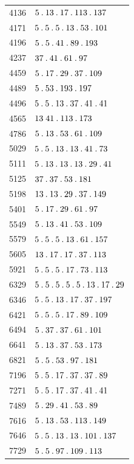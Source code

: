 \begin{longtable}{@{}r|l@{}}
4136 & $5\pdot 13\pdot 17\pdot 113\pdot 137$\\
4171 & $5\pdot 5\pdot 5\pdot 13\pdot 53\pdot 101$\\
4196 & $5\pdot 5\pdot 41\pdot 89\pdot 193$\\
4237 & $37\pdot 41\pdot 61\pdot 97$\\
4459 & $5\pdot 17\pdot 29\pdot 37\pdot 109$\\
4489 & $5\pdot 53\pdot 193\pdot 197$\\
4496 & $5\pdot 5\pdot 13\pdot 37\pdot 41\pdot 41$\\
4565 & $13\;41\pdot 113\pdot 173$\\
4786 & $5\pdot 13\pdot 53\pdot 61\pdot 109$\\
5029 & $5\pdot 5\pdot 13\pdot 13\pdot 41\pdot 73$\\
5111 & $5\pdot 13\pdot 13\pdot 13\pdot 29\pdot 41$\\
5125 & $37\pdot 37\pdot 53\pdot 181$\\
5198 & $13\pdot 13\pdot 29\pdot 37\pdot 149$\\
5401 & $5\pdot 17\pdot 29\pdot 61\pdot 97$\\
5549 & $5\pdot 13\pdot 41\pdot 53\pdot 109$\\
5579 & $5\pdot 5\pdot 5\pdot 13\pdot 61\pdot 157$\\
5605 & $13\pdot 17\pdot 17\pdot 37\pdot 113$\\
5921 & $5\pdot 5\pdot 5\pdot 17\pdot 73\pdot 113$\\
6329 & $5\pdot 5\pdot 5\pdot 5\pdot 5\pdot 13\pdot 17\pdot 29$\\
6346 & $5\pdot 5\pdot 13\pdot 17\pdot 37\pdot 197$\\
6421 & $5\pdot 5\pdot 5\pdot 17\pdot 89\pdot 109$\\
6494 & $5\pdot 37\pdot 37\pdot 61\pdot 101$\\
6641 & $5\pdot 13\pdot 37\pdot 53\pdot 173$\\
6821 & $5\pdot 5\pdot 53\pdot 97\pdot 181$\\
7196 & $5\pdot 5\pdot 17\pdot 37\pdot 37\pdot 89$\\
7271 & $5\pdot 5\pdot 17\pdot 37\pdot 41\pdot 41$\\
7489 & $5\pdot 29\pdot 41\pdot 53\pdot 89$\\
7616 & $5\pdot 13\pdot 53\pdot 113\pdot 149$\\
7646 & $5\pdot 5\pdot 13\pdot 13\pdot 101\pdot 137$\\
7729 & $5\pdot 5\pdot 97\pdot 109\pdot 113$\\

\end{longtable}
